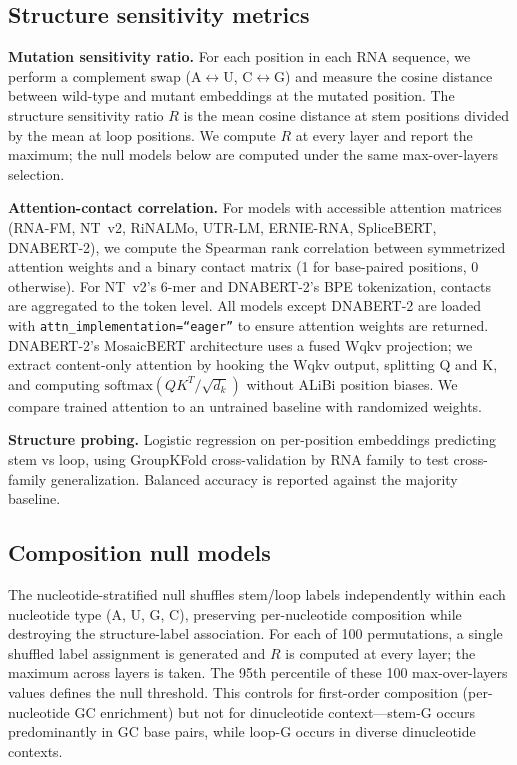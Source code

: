 \documentclass[11pt]{article}
\begin{document}
\subsection{Structure sensitivity metrics}
\label{sec:metrics}

\textbf{Mutation sensitivity ratio.}  For each position in each RNA
sequence, we perform a complement swap (A$\leftrightarrow$U,
C$\leftrightarrow$G) and measure the cosine distance between
wild-type and mutant embeddings at the mutated position.  The
structure sensitivity ratio $R$ is the mean cosine distance at stem
positions divided by the mean at loop positions.  We compute $R$ at
every layer and report the maximum; the null models below are computed
under the same max-over-layers selection.

\textbf{Attention-contact correlation.}  For models with accessible
attention matrices (RNA-FM, NT~v2, RiNALMo, UTR-LM, ERNIE-RNA,
SpliceBERT, DNABERT-2), we compute the Spearman rank correlation
between symmetrized attention weights and a binary contact matrix (1
for base-paired positions, 0 otherwise).  For NT~v2's 6-mer and
DNABERT-2's BPE tokenization, contacts are aggregated to the token
level.  All models except DNABERT-2 are loaded with
\texttt{attn\_implementation=``eager''} to ensure attention weights
are returned.  DNABERT-2's MosaicBERT architecture uses a fused Wqkv
projection; we extract content-only attention by hooking the Wqkv
output, splitting Q and K, and computing
$\mathrm{softmax}(QK^T/\sqrt{d_k})$ without ALiBi position biases.
We compare trained attention to an untrained baseline with
randomized weights.

\textbf{Structure probing.}  Logistic regression on per-position
embeddings predicting stem vs loop, using GroupKFold cross-validation
by RNA family to test cross-family generalization.  Balanced accuracy
is reported against the majority baseline.

\subsection{Composition null models}
\label{sec:nulls}

The nucleotide-stratified null shuffles stem/loop labels independently
within each nucleotide type (A, U, G, C), preserving per-nucleotide
composition while destroying the structure-label association.  For
each of 100 permutations, a single shuffled label assignment is
generated and $R$ is computed at every layer; the maximum across
layers is taken.  The 95th percentile of these 100 max-over-layers
values defines the null threshold.  This controls for first-order
composition (per-nucleotide GC enrichment) but not for dinucleotide
context---stem-G occurs predominantly in GC base pairs, while loop-G
occurs in diverse dinucleotide contexts.
\end{document}
